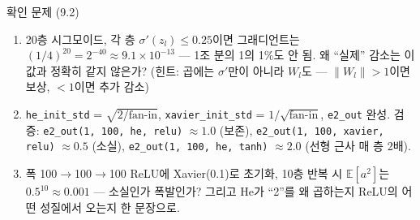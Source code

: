 \begin{frame}{확인 문제 (9.2)}
  \small
  \begin{enumerate}
    \item {} 20층 시그모이드, 각 층 $\sigma'(z_l) \le 0.25$이면
      그래디언트는 $(1/4)^{20} = 2^{-40} \approx 9.1 \times 10^{-13}$
      — 1조 분의 1의 1\%도 안 됨. 왜 ``실제'' 감소는 이 값과 정확히
      같지 않은가? (힌트: 곱에는 $\sigma'$만이 아니라 $W_l$도 —
      $\|W_l\| > 1$이면 보상, $< 1$이면 추가 감소)
    \item {} \texttt{he\_init\_std} = $\sqrt{2/\text{fan-in}}$,
      \texttt{xavier\_init\_std} = $1/\sqrt{\text{fan-in}}$,
      \texttt{e2\_out} 완성.
      검증: \texttt{e2\_out(1, 100, he, relu)} $\approx 1.0$ (보존),
      \texttt{e2\_out(1, 100, xavier, relu)} $\approx 0.5$ (소실),
      \texttt{e2\_out(1, 100, he, tanh)} $\approx 2.0$ (선형 근사
      매 층 2배).
    \item {} 폭 100$\to$100$\to$100 ReLU에 Xavier(0.1)로
      초기화, 10층 반복 시 $\mathbb{E}[a^2]$는 $0.5^{10} \approx 0.001$ —
      소실인가 폭발인가? 그리고 He가 ``2''를 왜 곱하는지 ReLU의
      어떤 성질에서 오는지 한 문장으로.
  \end{enumerate}
\end{frame}

